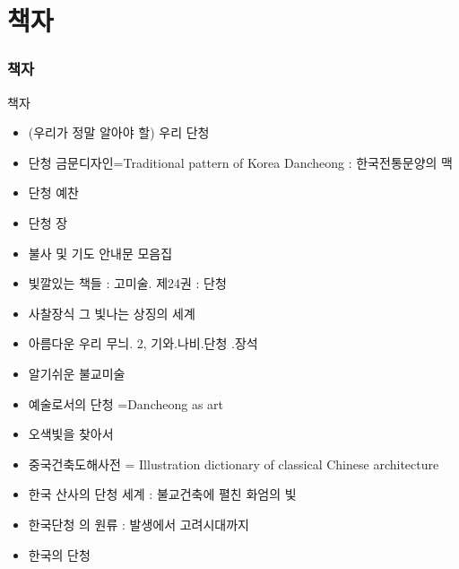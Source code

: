 \documentclass[aspectratio=1610,10pt,xcolor=pdftex,dvipsnames,table,handout]{beamer}
\begin{document}
		\section{ 책자 }
		\begin{frame} [t,plain]
		\frametitle{ 책자 }
			\begin{block} { 책자 }
			\setlength{\leftmargini}{2em}			
			\begin{itemize}
				\item (우리가 정말 알아야 할) 우리 단청
				\item 단청 금문디자인=Traditional pattern of Korea Dancheong : 한국전통문양의 맥
				\item 단청 예찬
				\item 단청 장
				\item 불사 및 기도 안내문 모음집
				\item 빛깔있는 책들 : 고미술. 제24권 : 단청
				\item 사찰장식 그 빛나는 상징의 세계
				\item 아름다운 우리 무늬. 2, 기와.나비.단청 .장석
				\item 알기쉬운 불교미술
				\item 예술로서의 단청 =Dancheong as art
				\item 오색빛을 찾아서
				\item 중국건축도해사전 = Illustration dictionary of classical Chinese architecture
				\item 한국 산사의 단청 세계 : 불교건축에 펼친 화엄의 빛
				\item 한국단청 의 원류 : 발생에서 고려시대까지
				\item 한국의 단청
			\end{itemize}
			\end{block}						

		\end{frame}						
		

\end{document}
